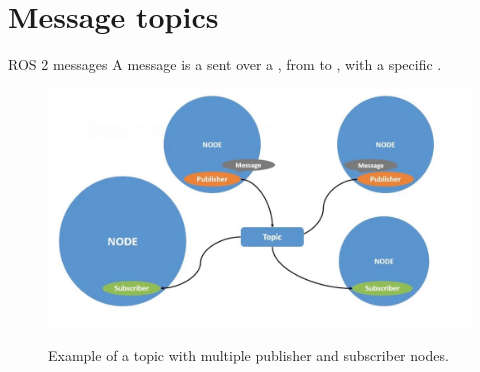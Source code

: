 
\section{Message topics}
\graphicspath{{figs/section3/}}

\begin{frame}{ROS 2 messages}
	A message is a  sent over a , from  to , with a specific .
	\begin{figure}
		\centering
		\includegraphics[scale=.2]{ros2Msg.jpg}
		\label{fig:msg}
		\caption{Example of a topic with multiple publisher and subscriber nodes.}
	\end{figure}
\end{frame}


